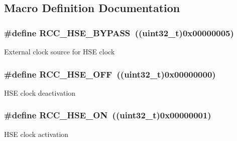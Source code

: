 \subsection{Macro Definition Documentation}
\hypertarget{group___r_c_c___h_s_e___config_ga5ca515db2d5c4d5bdb9ee3d154df2704}{
\subsubsection[{R\-C\-C\-\_\-\-H\-S\-E\-\_\-\-B\-Y\-P\-A\-S\-S}]{\setlength{\rightskip}{0pt plus 5cm}\#define R\-C\-C\-\_\-\-H\-S\-E\-\_\-\-B\-Y\-P\-A\-S\-S~((uint32\-\_\-t)0x00000005)}}\label{group___r_c_c___h_s_e___config_ga5ca515db2d5c4d5bdb9ee3d154df2704}
External clock source for H\-S\-E clock \hypertarget{group___r_c_c___h_s_e___config_ga1616626d23fbce440398578855df6f97}{
\subsubsection[{R\-C\-C\-\_\-\-H\-S\-E\-\_\-\-O\-F\-F}]{\setlength{\rightskip}{0pt plus 5cm}\#define R\-C\-C\-\_\-\-H\-S\-E\-\_\-\-O\-F\-F~((uint32\-\_\-t)0x00000000)}}\label{group___r_c_c___h_s_e___config_ga1616626d23fbce440398578855df6f97}
H\-S\-E clock deactivation \hypertarget{group___r_c_c___h_s_e___config_gabc4f70a44776c557af20496b04d9a9db}{
\subsubsection[{R\-C\-C\-\_\-\-H\-S\-E\-\_\-\-O\-N}]{\setlength{\rightskip}{0pt plus 5cm}\#define R\-C\-C\-\_\-\-H\-S\-E\-\_\-\-O\-N~((uint32\-\_\-t)0x00000001)}}\label{group___r_c_c___h_s_e___config_gabc4f70a44776c557af20496b04d9a9db}
H\-S\-E clock activation 